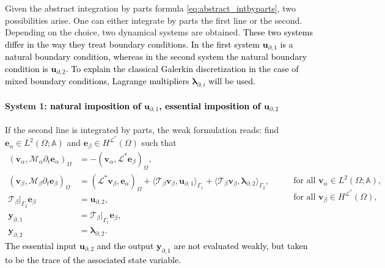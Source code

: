 \documentclass[11pt,a4paper]{article}
\newcommand{\innerproduct}[3][\Omega]{(#2, #3)_{#1}}
\newcommand{\boundary}[3][\partial\Omega]{\langle #2, #3\rangle_{#1}}
\newcommand{\revone}[1]{{\textcolor{black}{#1}}}
\begin{document}
Given the abstract integration by parts formula \eqref{eq:abstract_intbyparts}, two possibilities arise. One can either integrate by parts the first line or the second. Depending on the choice, two dynamical systems are obtained. \revone{These two systems differ in the way they treat boundary conditions. In the first system $\bm{u}_{\partial, 1}$ is a natural boundary condition, whereas in the second system the natural boundary condition is $\bm{u}_{\partial, 2}$. To explain the classical Galerkin discretization in the case of mixed boundary conditions, Lagrange multipliers $\bm{\lambda}_{\partial,i}$ will be used.
}
\paragraph{System 1: \revone{natural imposition of $\bm{u}_{\partial, 1}$, essential imposition of $\bm{u}_{\partial, 2}$}} 
If the second line is integrated by parts, the weak formulation reads: find $\bm{e}_{\alpha}  \in L^2(\Omega; \mathbb{A})$ and $\bm{e}_{\beta} \in H^{\mathcal{L}^*}(\Omega)$ such that
\begin{equation}
    \begin{aligned}
        \innerproduct{\bm{v}_{\alpha}}{\mathcal{M}_\alpha \partial_t\bm{e}_{\alpha}} &= -\innerproduct{\bm{v}_{\alpha}}{\mathcal{L}^*\bm{e}_{\beta}}, \\
        \innerproduct{\bm{v}_{\beta}}{\mathcal{M}_\beta \partial_t\bm{e}_{\beta}} &= \innerproduct{\mathcal{L}^*\bm{v}_{\beta}}{\bm{e}_{\alpha}} + \boundary[\Gamma_1]{\mathcal{T}_{\beta}\bm{v}_{\beta}}{\bm{u}_{\partial, 1}} + \boundary[\Gamma_2]{\mathcal{T}_{\beta}\bm{v}_{\beta}}{\bm{\lambda}_{\partial, 2}}, \\
        \mathcal{T}_{\beta}|_{\Gamma_2} \bm{e}_{\beta} &= \bm{u}_{\partial, 2}, \\
        \bm{y}_{\partial, 1} &= \mathcal{T}_\beta|_{\Gamma_1} \bm{e}_{\beta}, \\
        \bm{y}_{\partial, 2} &= \bm{\lambda}_{\partial, 2}.
    \end{aligned} \qquad 
    \begin{aligned}
        \text{for all } \bm{v}_{\alpha}  \in L^2(\Omega; \mathbb{A}), \\
        \text{for all } \bm{v}_{\beta} \in H^{\mathcal{L}^*}(\Omega), \\
        {} \\
        {} \\
        {}
    \end{aligned}
    \label{eq:weak_conforming_L}
\end{equation}
\revone{The essential input $\bm{u}_{\partial, 2}$ and the output $\bm{y}_{\partial, 1}$ are not evaluated weakly, but taken to be the trace of the associated state variable.}
\end{document}
